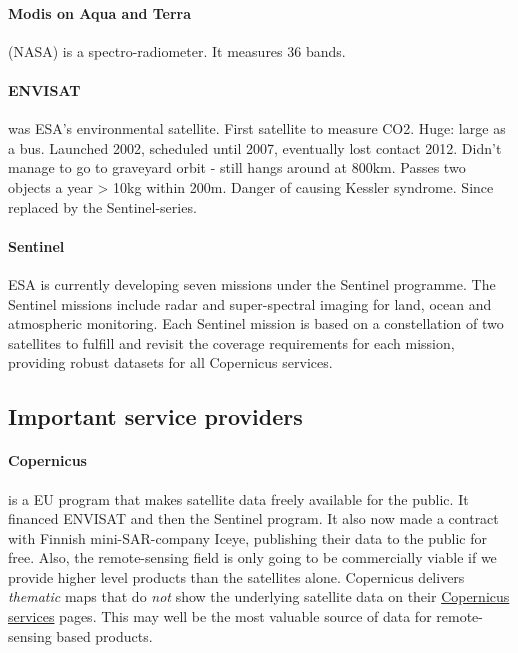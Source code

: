 \paragraph{Modis on Aqua and Terra} (NASA) is a spectro-radiometer. It measures 36 bands.

\paragraph{ENVISAT} was ESA's environmental satellite. First satellite to measure CO2. Huge: large as a bus. 
Launched 2002, scheduled until 2007, eventually lost contact 2012. Didn't manage to go to graveyard orbit - still hangs around at 800km.
Passes two objects a year > 10kg within 200m. Danger of causing Kessler syndrome.
Since replaced by the Sentinel-series.

\paragraph{Sentinel} ESA is currently developing seven missions under the Sentinel programme.
The Sentinel missions include radar and super-spectral imaging for land, ocean and atmospheric monitoring.
Each Sentinel mission is based on a constellation of two satellites to fulfill and revisit the coverage requirements
for each mission, providing robust datasets for all Copernicus services.


\subsection{Important service providers}

\paragraph{Copernicus} is a EU program that makes satellite data freely available for the public. It financed ENVISAT and then the Sentinel program.
It also now made a contract with Finnish mini-SAR-company Iceye, publishing their data to the public for free.
Also, the remote-sensing field is only going to be commercially viable if we provide higher level products than the satellites alone. 
Copernicus delivers \emph{thematic} maps that do \emph{not} show the underlying satellite data on their \href{https://www.copernicus.eu/en}{Copernicus services} pages.
This may well be the most valuable source of data for remote-sensing based products.


